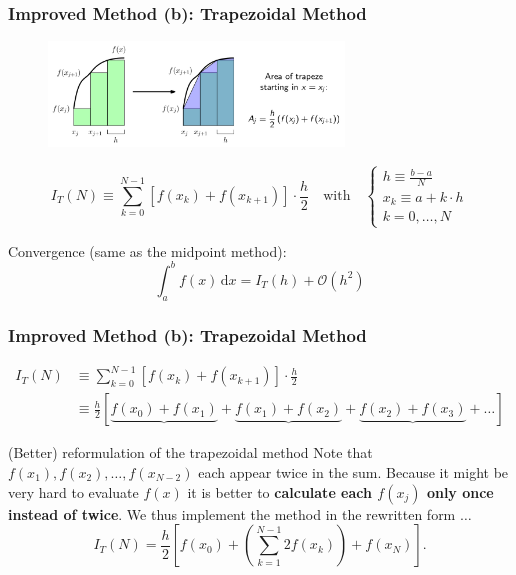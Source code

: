 \documentclass[11pt,aspectratio=169]{beamer}
\begin{document}
\begin{frame}
	\frametitle{Improved Method (b): Trapezoidal Method}
\begin{figure}
	\centering
	\includegraphics[width=0.7\textwidth]{fig/integration-trapez-with-text}
\end{figure}
\pause
\begin{equation*}
	I_T(N) \equiv  \sum_{k=0}^{N-1} \left[ f(x_k)+f(x_{k+1}) \right] \cdot \frac{h}{2}  \quad \text{with} \quad
	\begin{cases}
		h \equiv \frac{b-a}{N} \\
		x_k \equiv a + k \cdot h \\
		k = 0, \ldots, N
	\end{cases}
\end{equation*}

\pause

Convergence (same as the midpoint method):
\begin{equation*}
	\int_a^b f(x) \, \mathrm{d}x = I_T(h) + \mathcal{O}\left(h^2\right)
\end{equation*}

\end{frame}


\begin{frame}
\frametitle{Improved Method (b): Trapezoidal Method}
\begin{align*}
	I_T(N) & \equiv  \sum_{k=0}^{N-1} \left[ f(x_k)+f(x_{k+1}) \right] \cdot \frac{h}{2} \\
	 & \equiv \frac{h}{2}\left[\underbrace{f(x_0) + f(x_1)} + \underbrace{f(x_1) + f(x_2)} + \underbrace{f(x_2) + f(x_3)} + \ldots \right]
\end{align*}
\begin{block}{(Better) reformulation of the trapezoidal method}
	Note that $f(x_1), f(x_2), \ldots, f(x_{N-2})$ each appear twice in the sum. Because it might be very hard to evaluate $f(x)$  it is better to \textbf{calculate each $f(x_j)$ only once instead of twice}. We thus implement the method in the rewritten form $\ldots$
	\begin{equation*}
		I_T(N) = \frac{h}{2} \left[ f(x_0) + \left(\sum_{k=1}^{N-1}  2f(x_k)\right)+f(x_{N}) \right] \mathrm{.}
	\end{equation*}
\end{block}

\end{frame}
\end{document}
